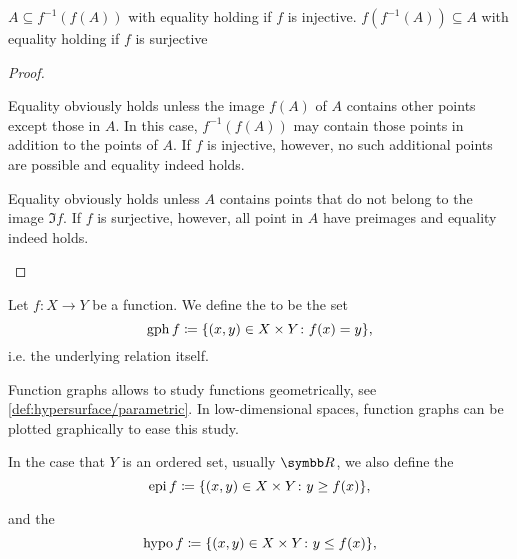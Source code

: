 \begin{proposition}\label{thm:function_image_preimage_composition}\mbox{}
  \begin{propenum}
     \( A \subseteq f^{-1}(f(A)) \) with equality holding if \( f \) is injective.
     \( f(f^{-1}(A)) \subseteq A \) with equality holding if \( f \) is surjective
  \end{propenum}
\end{proposition}
\begin{proof}
  \begin{description}
     Equality obviously holds unless the image \( f(A) \) of \( A \) contains other points except those in \( A \). In this case, \( f^{-1}(f(A)) \) may contain those points in addition to the points of \( A \). If \( f \) is injective, however, no such additional points are possible and equality indeed holds.

     Equality obviously holds unless \( A \) contains points that do not belong to the image \( \Im f \). If \( f \) is surjective, however, all point in \( A \) have preimages and equality indeed holds.
  \end{description}
\end{proof}

\begin{definition}\label{def:function_graph}
  Let \( f: X \to Y \) be a function. We define the  to be the set
  \begin{equation*}
    \operatorname{gph} f \coloneqq \{ (x, y) \in X \times Y \colon f(x) = y \},
  \end{equation*}
  i.e. the underlying relation itself.

  Function graphs allows to study functions geometrically, see \cref{def:hypersurface/parametric}. In low-dimensional spaces, function graphs can be plotted graphically to ease this study.

  In the case that \( Y \) is an ordered set, usually \( \BR \), we also define the 
  \begin{equation*}
    \operatorname{epi} f \coloneqq \{ (x, y) \in X \times Y \colon y \geq f(x) \},
  \end{equation*}

  and the 
  \begin{equation*}
    \operatorname{hypo} f \coloneqq \{ (x, y) \in X \times Y \colon y \leq f(x) \},
  \end{equation*}
\end{definition}

